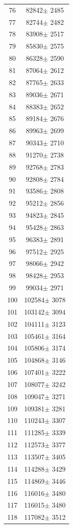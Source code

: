 \documentclass[a4paper]{instrumentacao}
\begin{document}
\begin{longtable}{cc}
 76 & 82842$\pm$ 2485 \\
 77 & 82744$\pm$ 2482 \\
 78 & 83908$\pm$ 2517 \\
 79 & 85830$\pm$ 2575 \\
 80 & 86328$\pm$ 2590 \\
 81 & 87064$\pm$ 2612 \\
 82 & 87765$\pm$ 2633 \\
 83 & 89036$\pm$ 2671 \\
 84 & 88383$\pm$ 2652 \\
 85 & 89184$\pm$ 2676 \\
 86 & 89963$\pm$ 2699 \\
 87 & 90343$\pm$ 2710 \\
 88 & 91270$\pm$ 2738 \\
 89 & 92768$\pm$ 2783 \\
 90 & 92808$\pm$ 2784 \\
 91 & 93586$\pm$ 2808 \\
 92 & 95212$\pm$ 2856 \\
 93 & 94823$\pm$ 2845 \\
 94 & 95428$\pm$ 2863 \\
 95 & 96383$\pm$ 2891 \\
 96 & 97512$\pm$ 2925 \\
 97 & 98066$\pm$ 2942 \\
 98 & 98428$\pm$ 2953 \\
 99 & 99034$\pm$ 2971 \\
 100 & 102584$\pm$ 3078 \\
 101 & 103142$\pm$ 3094 \\
 102 & 104111$\pm$ 3123 \\
 103 & 105461$\pm$ 3164 \\
 104 & 105806$\pm$ 3174 \\
 105 & 104868$\pm$ 3146 \\
 106 & 107401$\pm$ 3222 \\
 107 & 108077$\pm$ 3242 \\
 108 & 109047$\pm$ 3271 \\
 109 & 109381$\pm$ 3281 \\
 110 & 110243$\pm$ 3307 \\
 111 & 111285$\pm$ 3339 \\
 112 & 112573$\pm$ 3377 \\
 113 & 113507$\pm$ 3405 \\
 114 & 114288$\pm$ 3429 \\
 115 & 114869$\pm$ 3446 \\
 116 & 116016$\pm$ 3480 \\
 117 & 116015$\pm$ 3480 \\
 118 & 117082$\pm$ 3512 \\
\end{longtable}
\end{document}
